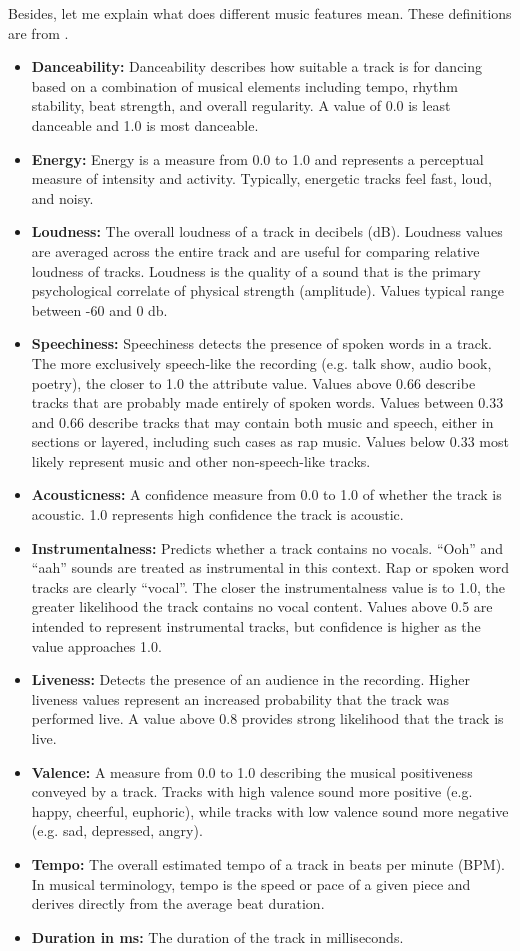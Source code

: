 \documentclass[12pt]{article}
\theoremstyle{plain}
\theoremstyle{definition}
\theoremstyle{remark}
\begin{document}
Besides, let me explain what does different music features mean. These definitions are from \cite{2.3}.
\begin{itemize}
    \item \textbf{Danceability:} Danceability describes how suitable a track is for dancing based on a combination of musical elements including tempo, rhythm stability, beat strength, and overall regularity. A value of 0.0 is least danceable and 1.0 is most danceable.
    \item \textbf{Energy:} Energy is a measure from 0.0 to 1.0 and represents a perceptual measure of intensity and activity. Typically, energetic tracks feel fast, loud, and noisy. 
    \item \textbf{Loudness:} The overall loudness of a track in decibels (dB). Loudness values are averaged across the entire track and are useful for comparing relative loudness of tracks. Loudness is the quality of a sound that is the primary psychological correlate of physical strength (amplitude). Values typical range between -60 and 0 db.
    \item \textbf{Speechiness:} Speechiness detects the presence of spoken words in a track. The more exclusively speech-like the recording (e.g. talk show, audio book, poetry), the closer to 1.0 the attribute value. Values above 0.66 describe tracks that are probably made entirely of spoken words. Values between 0.33 and 0.66 describe tracks that may contain both music and speech, either in sections or layered, including such cases as rap music. Values below 0.33 most likely represent music and other non-speech-like tracks.
    \item \textbf{Acousticness:} A confidence measure from 0.0 to 1.0 of whether the track is acoustic. 1.0 represents high confidence the track is acoustic.
    \item \textbf{Instrumentalness:} Predicts whether a track contains no vocals. “Ooh” and “aah” sounds are treated as instrumental in this context. Rap or spoken word tracks are clearly “vocal”. The closer the instrumentalness value is to 1.0, the greater likelihood the track contains no vocal content. Values above 0.5 are intended to represent instrumental tracks, but confidence is higher as the value approaches 1.0.
    \item \textbf{Liveness:} Detects the presence of an audience in the recording. Higher liveness values represent an increased probability that the track was performed live. A value above 0.8 provides strong likelihood that the track is live.
    \item \textbf{Valence:} A measure from 0.0 to 1.0 describing the musical positiveness conveyed by a track. Tracks with high valence sound more positive (e.g. happy, cheerful, euphoric), while tracks with low valence sound more negative (e.g. sad, depressed, angry).
    \item \textbf{Tempo:} The overall estimated tempo of a track in beats per minute (BPM). In musical terminology, tempo is the speed or pace of a given piece and derives directly from the average beat duration.
    \item \textbf{Duration in ms:} The duration of the track in milliseconds.
\end{itemize}
\end{document}
